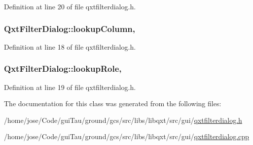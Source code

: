 Definition at line 20 of file qxtfilterdialog.\-h.

\hypertarget{class_qxt_filter_dialog_a483a82e5e9a72c5929f25162ef05d8b8}{
\subsubsection[{lookup\-Column}]{ Qxt\-Filter\-Dialog\-::lookup\-Column\hspace{0.3cm}{\ttfamily [read]}, {\ttfamily [write]}}}\label{class_qxt_filter_dialog_a483a82e5e9a72c5929f25162ef05d8b8}


Definition at line 18 of file qxtfilterdialog.\-h.

\hypertarget{class_qxt_filter_dialog_a4a6dc70156b91fd6f287a08d44e64748}{
\subsubsection[{lookup\-Role}]{ Qxt\-Filter\-Dialog\-::lookup\-Role\hspace{0.3cm}{\ttfamily [read]}, {\ttfamily [write]}}}\label{class_qxt_filter_dialog_a4a6dc70156b91fd6f287a08d44e64748}


Definition at line 19 of file qxtfilterdialog.\-h.



The documentation for this class was generated from the following files\-:\begin{DoxyCompactItemize}
\item 
/home/jose/\-Code/gui\-Tau/ground/gcs/src/libs/libqxt/src/gui/\hyperlink{qxtfilterdialog_8h}{qxtfilterdialog.\-h}\item 
/home/jose/\-Code/gui\-Tau/ground/gcs/src/libs/libqxt/src/gui/\hyperlink{qxtfilterdialog_8cpp}{qxtfilterdialog.\-cpp}\end{DoxyCompactItemize}
